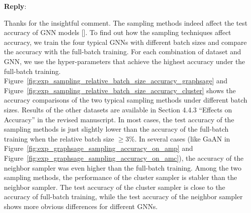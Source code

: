 \documentclass[12pt]{article}
\newenvironment{reply}
   {\medskip \noindent \textbf{Reply}:\  }
   {\medskip}
\begin{document}
\begin{reply}

    Thanks for the insightful comment.
    The sampling methods indeed affect the test accuracy of GNN models [\cite{hamilton2017_graphsage, chiang2019_cluster_gcn, zeng2020_graphsaint}].
    To find out how the sampling techniques affect accuracy, we train the four typical GNNs with different batch sizes and compare the accuracy with the full-batch training.
    For each combination of dataset and GNN, we use the hyper-parameters that achieve the highest accuracy under the full-batch training.
    Figure~\ref{fig:exp_sampling_relative_batch_size_accuracy_graphsage}  and Figure~\ref{fig:exp_sampling_relative_batch_size_accuracy_cluster} shows the accuracy comparisons of the two typical sampling methods under different batch sizes.
    Results of the other datasets are available in Section 4.4.3 ``Effects on Accuracy'' in the revised manuscript.
    In most cases, the test accuracy of the sampling methods is just slightly lower than the accuracy of the full-batch training when the relative batch size $\geq 3\%$.
    In several cases (like GaAN in Figure~\ref{fig:exp_graphsage_sampling_accuracy_on_amp} and Figure~\ref{fig:exp_graphsage_sampling_accuracy_on_amc}), the accuracy of the neighbor sampler was even higher than the full-batch training.
    Among the two sampling methods, the performance of the cluster sampler is stabler than the neighbor sampler.
    The test accuracy of the cluster sampler is close to the accuracy of full-batch training, while the test accuracy of the neighbor sampler shows more obvious differences for different GNNs.
        


\end{reply}
\end{document}
